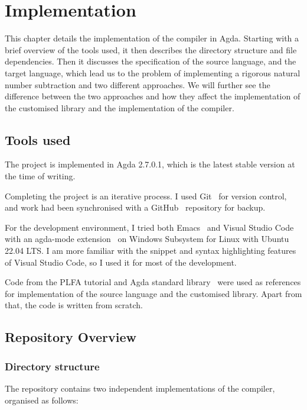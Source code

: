 \documentclass[12pt,a4paper]{report}
\theoremstyle{definition}
\begin{document}
\chapter{Implementation} \label{chap: implementation}
    \minitoc
    This chapter details the implementation of the compiler in Agda. Starting with a brief overview of the tools used, it then describes the directory structure and file dependencies. Then it discusses the specification of the source language, and the target language, which lead us to the problem of implementing a rigorous natural number subtraction and two different approaches. We will further see the difference between the two approaches and how they affect the implementation of the customised library and the implementation of the compiler. 
    

    \section{Tools used}
    The project is implemented in Agda 2.7.0.1, which is the latest stable version at the time of writing.

    Completing the project is an iterative process. I used Git~\autocite{git} for version control, and work had been synchronised with a GitHub~\autocite{github} repository for backup.

    For the development environment, I tried both Emacs~\autocite{emacs} and Visual Studio Code~\autocite{vscode} with an agda-mode extension~\autocite{agda_mode} on Windows Subsystem for Linux with Ubuntu~\autocite{wsl_ubuntu} 22.04 LTS. I am more familiar with the snippet and syntax highlighting features of Visual Studio Code, so I used it for most of the development. 

    Code from the PLFA tutorial and Agda standard library~\autocite{agda_std} were used as references for implementation of the source language and the customised library. Apart from that, the code is written from scratch.

    \section{Repository Overview}
        \subsection{Directory structure}
        The repository contains two independent implementations of the compiler, organised as follows:
\end{document}
